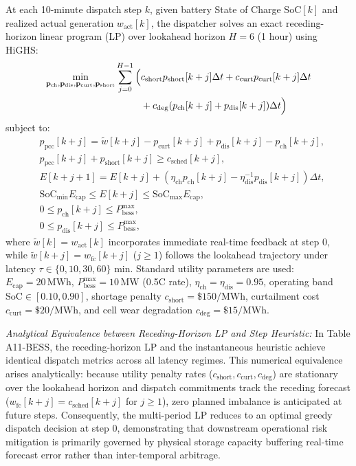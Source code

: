 \documentclass[
  journal]{IEEEtran}
\begin{document}
At each 10-minute dispatch step \(k\), given battery State of Charge
\(\mathrm{SoC}[k]\) and realized actual generation
\(w_{\mathrm{act}}[k]\), the dispatcher solves an exact receding-horizon
linear program (LP) over lookahead horizon \(H=6\) (1 hour) using HiGHS:
\begin{align}
\min_{\mathbf{p}_{\mathrm{ch}}, \mathbf{p}_{\mathrm{dis}}, \mathbf{p}_{\mathrm{curt}}, \mathbf{p}_{\mathrm{short}}} \sum_{j=0}^{H-1} \Big( &c_{\mathrm{short}} p_{\mathrm{short}}[k+j] \Delta t + c_{\mathrm{curt}} p_{\mathrm{curt}}[k+j] \Delta t \notag \\
&+ c_{\mathrm{deg}} (p_{\mathrm{ch}}[k+j] + p_{\mathrm{dis}}[k+j]) \Delta t \Big)
\end{align} subject to: \begin{align}
&p_{\mathrm{pcc}}[k+j] = \tilde{w}[k+j] - p_{\mathrm{curt}}[k+j] + p_{\mathrm{dis}}[k+j] - p_{\mathrm{ch}}[k+j], \\
&p_{\mathrm{pcc}}[k+j] + p_{\mathrm{short}}[k+j] \ge c_{\mathrm{sched}}[k+j], \\
&E[k+j+1] = E[k+j] + (\eta_{\mathrm{ch}} p_{\mathrm{ch}}[k+j] - \eta_{\mathrm{dis}}^{-1} p_{\mathrm{dis}}[k+j]) \Delta t, \\
&\mathrm{SoC}_{\min} E_{\mathrm{cap}} \le E[k+j] \le \mathrm{SoC}_{\max} E_{\mathrm{cap}}, \\
&0 \le p_{\mathrm{ch}}[k+j] \le P_{\mathrm{bess}}^{\max}, \\
&0 \le p_{\mathrm{dis}}[k+j] \le P_{\mathrm{bess}}^{\max},
\end{align} where \(\tilde{w}[k] = w_{\mathrm{act}}[k]\) incorporates
immediate real-time feedback at step 0, while
\(\tilde{w}[k+j] = w_{\mathrm{fc}}[k+j]\) (\(j \ge 1\)) follows the
lookahead trajectory under latency
\(\tau \in \{0, 10, 30, 60\}\text{ min}\). Standard utility parameters
are used: \(E_{\mathrm{cap}} = 20\,\text{MWh}\),
\(P_{\mathrm{bess}}^{\max} = 10\,\text{MW}\) (0.5C rate),
\(\eta_{\mathrm{ch}} = \eta_{\mathrm{dis}} = 0.95\), operating band
\(\mathrm{SoC} \in [0.10, 0.90]\), shortage penalty
\(c_{\mathrm{short}} = \$150/\text{MWh}\), curtailment cost
\(c_{\mathrm{curt}} = \$20/\text{MWh}\), and cell wear degradation
\(c_{\mathrm{deg}} = \$15/\text{MWh}\).

\emph{Analytical Equivalence between Receding-Horizon LP and Step
Heuristic:} In Table A11-BESS, the receding-horizon LP and the
instantaneous heuristic achieve identical dispatch metrics across all
latency regimes. This numerical equivalence arises analytically: because
utility penalty rates
(\(c_{\mathrm{short}}, c_{\mathrm{curt}}, c_{\mathrm{deg}}\)) are
stationary over the lookahead horizon and dispatch commitments track the
receding forecast (\(w_{\mathrm{fc}}[k+j] = c_{\mathrm{sched}}[k+j]\)
for \(j \ge 1\)), zero planned imbalance is anticipated at future steps.
Consequently, the multi-period LP reduces to an optimal greedy dispatch
decision at step 0, demonstrating that downstream operational risk
mitigation is primarily governed by physical storage capacity buffering
real-time forecast error rather than inter-temporal arbitrage.
\end{document}
